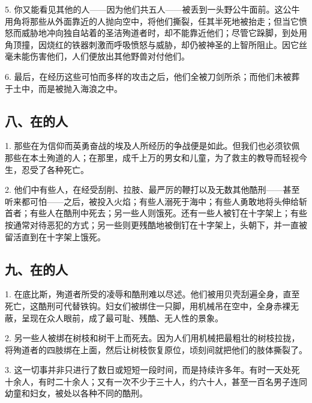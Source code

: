 5. 你又能看见其他的人——因为他们共五人——被丢到一头野公牛面前。这公牛用角将那些从外面靠近的人抛向空中，将他们撕裂，任其半死地被抬走；但当它愤怒而威胁地冲向独自站着的圣洁殉道者时，却不能靠近他们；尽管它跺脚，到处用角顶撞，因烧红的铁器刺激而呼吸愤怒与威胁，却仍被神圣的上智所阻止。因它丝毫未能伤害他们，人们便放出其他野兽对付他们。\par

6. 最后，在经历这些可怕而多样的攻击之后，他们全被刀剑所杀；而他们未被葬于土中，而是被抛入海浪之中。\par


\subsection{八、在的人}

1. 那些在为信仰而英勇奋战的埃及人所经历的争战便是如此。但我们也必须钦佩那些在本土殉道的人；在那里，成千上万的男女和儿童，为了救主的教导而轻视今生，忍受了各种死亡。\par

2. 他们中有些人，在经受刮削、拉肢、最严厉的鞭打以及无数其他酷刑——甚至听来都可怕——之后，被投入火焰；有些人溺死于海中；有些人勇敢地将头伸给斩首者；有些人在酷刑中死去；另一些人则饿死。还有一些人被钉在十字架上；有些按通常对待恶犯的方式；另一些则更残酷地被倒钉在十字架上，头朝下，并一直被留活直到在十字架上饿死。\par


\subsection{九、在的人}

1. 在底比斯，殉道者所受的凌辱和酷刑难以尽述。他们被用贝壳刮遍全身，直至死亡，这酷刑可代替铁钩。妇女们被绑住一只脚，用机械吊在空中，全身赤裸无蔽，呈现在众人眼前，成了最可耻、残酷、无人性的景象。\par

2. 另一些人被绑在树枝和树干上而死去。因为人们用机械把最粗壮的树枝拉拢，将殉道者的四肢绑在上面，然后让树枝恢复原位，顷刻间就把他们的肢体撕裂了。\par

3. 这一切事并非只进行了数日或短短一段时间，而是持续许多年。有时一天处死十余人，有时二十余人；又有一次不少于三十人，约六十人，甚至一百名男子连同幼童和妇女，被处以各种不同的酷刑。\par

